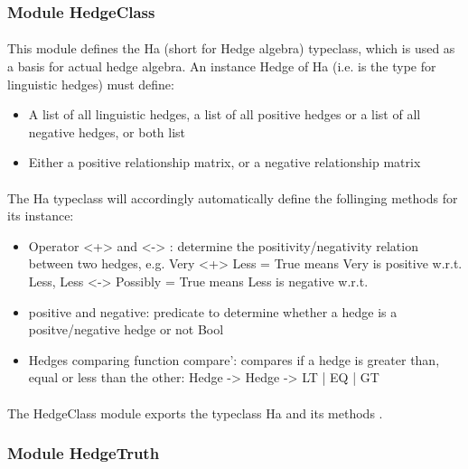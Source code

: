\documentclass[../gr-final.tex]{subfiles}
\begin{document}
\subsubsection{Module HedgeClass}

\paragraph{}This module defines the Ha (short for Hedge algebra) typeclass, which is used as a basis for  actual hedge algebra. An instance Hedge of Ha (i.e. is the type for linguistic hedges) must define:

\begin{itemize}
\item A list of all linguistic hedges,  a list of all
  positive hedges or a list of all negative hedges, or both list
\item  Either a positive relationship matrix, or a negative relationship
  matrix
\end{itemize}

\paragraph{}The Ha typeclass will accordingly automatically define the
follinging methods for its instance:

\begin{itemize}
\item Operator <+> and <-> : determine the positivity/negativity
  relation between two hedges, e.g. Very <+> Less = True means Very is
  positive w.r.t. Less, Less <-> Possibly = True means Less is
  negative w.r.t. 
\item positive and negative: predicate to determine whether a hedge is
  a positve/negative hedge or not
  Bool\item  Hedges comparing function compare': compares if a hedge
  is greater than, equal or less than the other: Hedge -> Hedge -> LT | EQ | GT 
\end{itemize}

\paragraph{}The HedgeClass module exports the typeclass Ha and its methods .

\subsubsection{Module HedgeTruth}
\end{document}
